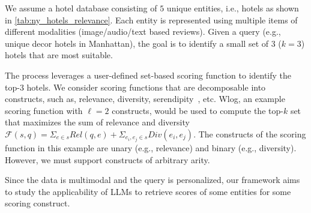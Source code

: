 \smallskip {}
We assume a hotel database consisting of $5$ unique entities, i.e., hotels as shown in \autoref{tab:ny_hotels_relevance}. Each entity is represented using multiple items of different modalities (image/audio/text based reviews). Given a query (e.g., unique decor hotels in Manhattan), the goal is to identify a small set of $3$ ($k=3$) hotels that are most suitable.

The process leverages a user-defined set-based scoring function to identify the top-$3$ hotels. We consider scoring functions that are decomposable into constructs, such as, relevance, diversity, serendipity~\cite{div1,div2,div3,div4}, etc. Wlog, an example scoring function with $\ell=2$ constructs, would be used to compute the top-$k$ set that maximizes the sum of relevance and diversity $\mathcal{F}(s, q)= \Sigma_{e \in s} Rel(q,e)+ \Sigma_{e_i,e_j \in s} Div(e_i,e_j)$. The constructs of the scoring function in this example are unary (e.g., relevance) and binary (e.g., diversity). However, we must support constructs of arbitrary arity. 

Since the data is multimodal and the query is personalized, our framework aims to study the applicability of LLMs to retrieve scores of some entities for some scoring construct. %



